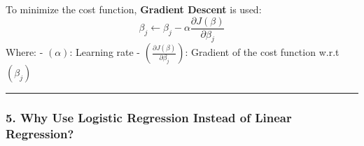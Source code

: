 \documentclass[12pt]{book}
\begin{document}
To minimize the cost function, \textbf{Gradient Descent} is used: \[
\beta_j \leftarrow \beta_j - \alpha \frac{\partial J(\beta)}{\partial \beta_j}
\] Where: - \(( \alpha )\): Learning rate -
\(( \frac{\partial J(\beta)}{\partial \beta_j} )\): Gradient of the cost
function w.r.t \(( \beta_j )\)

\begin{center}\rule{0.5\linewidth}{0.5pt}\end{center}

\subsubsection{\texorpdfstring{5. \textbf{Why Use Logistic Regression
Instead of Linear
Regression?}}{5. Why Use Logistic Regression Instead of Linear Regression?}}\label{why-use-logistic-regression-instead-of-linear-regression}
\end{document}
